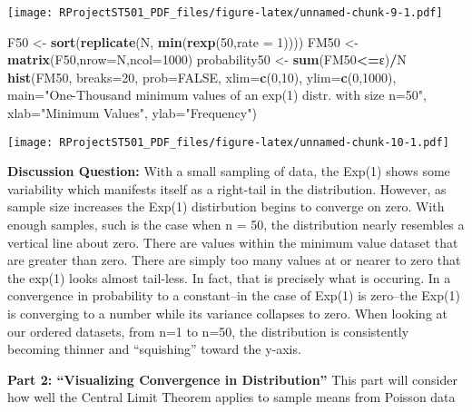 \documentclass[
]{article}
\newenvironment{Shaded}{\begin{snugshade}}{\end{snugshade}}
\newcommand{\DataTypeTok}[1]{\textcolor[rgb]{0.13,0.29,0.53}{#1}}
\newcommand{\DecValTok}[1]{\textcolor[rgb]{0.00,0.00,0.81}{#1}}
\newcommand{\KeywordTok}[1]{\textcolor[rgb]{0.13,0.29,0.53}{\textbf{#1}}}
\newcommand{\NormalTok}[1]{#1}
\newcommand{\OperatorTok}[1]{\textcolor[rgb]{0.81,0.36,0.00}{\textbf{#1}}}
\newcommand{\OtherTok}[1]{\textcolor[rgb]{0.56,0.35,0.01}{#1}}
\newcommand{\StringTok}[1]{\textcolor[rgb]{0.31,0.60,0.02}{#1}}
\begin{document}
\texttt{[image: RProjectST501\_PDF\_files/figure-latex/unnamed-chunk-9-1.pdf]}

\begin{Shaded}
\begin{Highlighting}[]
\NormalTok{F50 <-}\StringTok{ }\KeywordTok{sort}\NormalTok{(}\KeywordTok{replicate}\NormalTok{(N, }\KeywordTok{min}\NormalTok{(}\KeywordTok{rexp}\NormalTok{(}\DecValTok{50}\NormalTok{,}\DataTypeTok{rate =} \DecValTok{1}\NormalTok{))))}
\NormalTok{FM50 <-}\StringTok{ }\KeywordTok{matrix}\NormalTok{(F50,}\DataTypeTok{nrow=}\NormalTok{N,}\DataTypeTok{ncol=}\DecValTok{1000}\NormalTok{)}
\NormalTok{probability50 <-}\StringTok{ }\KeywordTok{sum}\NormalTok{(FM50}\OperatorTok{<=}\NormalTok{ε)}\OperatorTok{/}\NormalTok{N}
\KeywordTok{hist}\NormalTok{(FM50, }\DataTypeTok{breaks=}\DecValTok{20}\NormalTok{, }\DataTypeTok{prob=}\OtherTok{FALSE}\NormalTok{, }\DataTypeTok{xlim=}\KeywordTok{c}\NormalTok{(}\DecValTok{0}\NormalTok{,}\DecValTok{10}\NormalTok{), }\DataTypeTok{ylim=}\KeywordTok{c}\NormalTok{(}\DecValTok{0}\NormalTok{,}\DecValTok{1000}\NormalTok{), }\DataTypeTok{main=}\StringTok{"One-Thousand minimum values of an exp(1) distr. with size n=50"}\NormalTok{, }\DataTypeTok{xlab=}\StringTok{"Minimum Values"}\NormalTok{, }\DataTypeTok{ylab=}\StringTok{"Frequency"}\NormalTok{)}
\end{Highlighting}
\end{Shaded}

\texttt{[image: RProjectST501\_PDF\_files/figure-latex/unnamed-chunk-10-1.pdf]}

\textbf{Discussion Question:} With a small sampling of data, the Exp(1)
shows some variability which manifests itself as a right-tail in the
distribution. However, as sample size increases the Exp(1) distirbution
begins to converge on zero. With enough samples, such is the case when n
= 50, the distribution nearly resembles a vertical line about zero.
There are values within the minimum value dataset that are greater than
zero. There are simply too many values at or nearer to zero that the
exp(1) looks almost tail-less. In fact, that is precisely what is
occuring. In a convergence in probability to a constant--in the case of
Exp(1) is zero--the Exp(1) is converging to a number while its variance
collapses to zero. When looking at our ordered datasets, from n=1 to
n=50, the distribution is consistently becoming thinner and
``squishing'' toward the y-axis.

\textbf{Part 2: ``Visualizing Convergence in Distribution''} This part
will consider how well the Central Limit Theorem applies to sample means
from Poisson data
\end{document}
